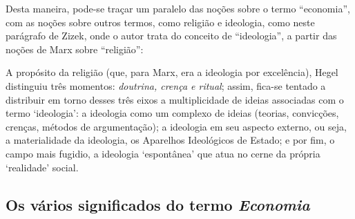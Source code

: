 \documentclass[
	12pt,				%
	oneside,			%
	a4paper,			%
	chapter=TITLE,		%
	section=TITLE,		%
	english,			%
	brazil				%
	]{abntex2}
\begin{document}
\begin{refsection}
Desta maneira, pode-se traçar um paralelo das noções sobre o termo ``economia'',
com as noções sobre outros termos, como religião e ideologia, como neste
parágrafo de Zizek, onde o autor trata do conceito de ``ideologia'', a partir das
noções de Marx sobre ``religião'':
\begin{citacao}
A propósito da religião (que, para Marx, era a ideologia por excelência), Hegel
distinguiu três momentos: \emph{doutrina, crença e ritual}; assim, fica-se
tentado a distribuir em torno desses três eixos a multiplicidade de ideias
associadas com o termo `ideologia': a ideologia como um complexo de ideias
(teorias, convicções, crenças, métodos de argumentação); a ideologia em seu
aspecto externo, ou seja, a materialidade da ideologia, os Aparelhos Ideológicos
de Estado; e por fim, o campo mais fugidio, a ideologia `espontânea' que atua
no cerne da própria `realidade' social.
\cite[p.~15]{zizek}
\end{citacao}
\hypertarget{os-vuxe1rios-significados-do-termo}{%
\subsection{\texorpdfstring{Os vários significados do termo \emph{Economia}}{Os vários significados do termo }}\label{os-vuxe1rios-significados-do-termo}}


\end{refsection}
\end{document}
